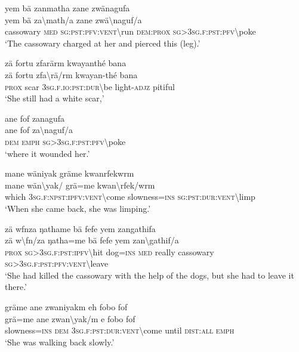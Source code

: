 \ea\label{ex:14:a3043}
yem bä zanmatha zane zwänagufa\\
\gll yem	bä	za{\textbackslash}math/a	zane	zwä{\textbackslash}naguf/a\\
     cassowary	\textsc{med}	\textsc{sg}:\textsc{pst}:\textsc{pfv}:\textsc{vent}{\textbackslash}run	\textsc{dem}:\textsc{prox}	\textsc{sg}>3\textsc{sg}.\textsc{f}:\textsc{pst}:\textsc{pfv}{\textbackslash}poke\\
\glt `The cassowary charged at her and pierced this (leg).'
\z

\ea\label{ex:14:a3044}
zä fortu zfarärm kwayanthé bana\\
\gll zä	fortu	zfa{\textbackslash}rä/rm	kwayan-thé	bana\\
     \textsc{prox}	scar	3\textsc{sg}.\textsc{f}.\textsc{io}:\textsc{pst}:\textsc{dur}{\textbackslash}be	light-\textsc{adjz}	pitiful\\
\glt `She still had a white scar,'
\z

\ea\label{ex:14:a3045}
ane fof zanagufa\\
\gll ane	fof	za{\textbackslash}naguf/a\\
     \textsc{dem}	\textsc{emph}	\textsc{sg}>3\textsc{sg}.\textsc{f}:\textsc{pst}:\textsc{pfv}{\textbackslash}poke\\
\glt `where it wounded her.'
\z

\ea\label{ex:14:a3046}
mane wäniyak gräme kwanrfekwrm\\
\gll mane	wän{\textbackslash}yak/	grä=me	kwan{\textbackslash}rfek/wrm\\
     which	3\textsc{sg}.\textsc{f}:\textsc{npst}:\textsc{ipfv}:\textsc{vent}{\textbackslash}come	slowness=\textsc{ins}	\textsc{sg}:\textsc{pst}:\textsc{dur}:\textsc{vent}{\textbackslash}limp\\
\glt `When she came back, she was limping.'
\z

\ea\label{ex:14:a3048}
zä wfnza ŋathame bä fefe yem zangathifa\\
\gll zä	w{\textbackslash}fn/za	ŋatha=me	bä	fefe	yem	zan{\textbackslash}gathif/a\\
     \textsc{prox}	\textsc{sg}>3\textsc{sg}.\textsc{f}:\textsc{pst}:\textsc{ipfv}{\textbackslash}hit	dog=\textsc{ins}	\textsc{med}	really	cassowary	\textsc{sg}>3\textsc{sg}.\textsc{f}:\textsc{pst}:\textsc{pfv}:\textsc{vent}{\textbackslash}leave\\
\glt `She had killed the cassowary with the help of the dogs, but she had to leave it there.'
\z

\ea\label{ex:14:a3050}
gräme ane zwaniyakm eh fobo fof\\
\gll grä=me	ane	zwan{\textbackslash}yak/m	e	fobo	fof\\
     slowness=\textsc{ins}	\textsc{dem}	3\textsc{sg}.\textsc{f}:\textsc{pst}:\textsc{dur}:\textsc{vent}{\textbackslash}come	until	\textsc{dist}:\textsc{all}	\textsc{emph}\\
\glt `She was walking back slowly.'
\z

